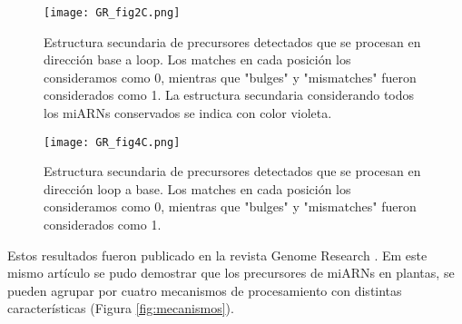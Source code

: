 \begin{figure}[htbp!] 
    \centering    
    \texttt{[image: GR\_fig2C.png]}
    \caption[Estructura secundaria de precursores de base a loop]{Estructura secundaria de precursores detectados que se procesan en dirección base a loop.
    Los matches en cada posición los consideramos como 0, mientras que "bulges" y "mismatches" fueron considerados como 1.
    La estructura secundaria considerando todos los miARNs conservados se indica con color violeta.
    }
    \label{fig:GR_fig2C}
\end{figure}

\begin{figure}[htbp!] 
    \centering    
    \texttt{[image: GR\_fig4C.png]}
    \caption[Estructura secundaria de precursores de loop a base]{
    Estructura secundaria de precursores detectados que se procesan en dirección loop a base.
    Los matches en cada posición los consideramos como 0, mientras que "bulges" y "mismatches" fueron considerados como 1.}
    \label{fig:GR_fig4C}
\end{figure}


Estos resultados fueron publicado en la revista Genome Research \citep{Bologna2013}.
Em este mismo artículo se pudo demostrar que los precursores de miARNs en plantas, se pueden agrupar por cuatro mecanismos de procesamiento con distintas características (Figura \ref{fig:mecanismos}).

